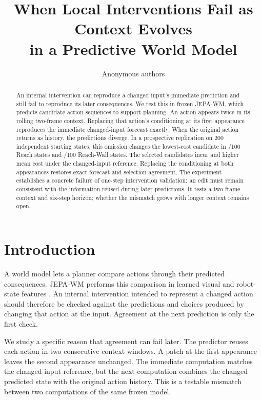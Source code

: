 \documentclass{article}
\title{When Local Interventions Fail as Context Evolves\\in a Predictive World Model}
\author{Anonymous authors}
\begin{document}
\raggedbottom
\maketitle

\begin{abstract}
An internal intervention can reproduce a changed input's immediate prediction and still fail to reproduce its later consequences. We test this in frozen JEPA-WM, which predicts candidate action sequences to support planning. An action appears twice in its rolling two-frame context. Replacing that action's conditioning at its first appearance reproduces the immediate changed-input forecast exactly. When the original action returns as history, the predictions diverge. In a prospective replication on 200 independent starting states, this omission changes the lowest-cost candidate in \LCFMReachChanged/100 Reach states and \LCFMWallChanged/100 Reach-Wall states. The selected candidates incur \LCFMReachCost{} and \LCFMWallCost{} higher mean cost under the changed-input reference. Replacing the conditioning at both appearances restores exact forecast and selection agreement. The experiment establishes a concrete failure of one-step intervention validation: an edit must remain consistent with the information reused during later predictions. It tests a two-frame context and six-step horizon; whether the mismatch grows with longer context remains open.
\end{abstract}

\section{Introduction}
A world model lets a planner compare actions through their predicted consequences. JEPA-WM performs this comparison in learned visual and robot-state features \citep{terver2025jepawm}. An internal intervention intended to represent a changed action should therefore be checked against the predictions and choices produced by changing that action at the input. Agreement at the next prediction is only the first check.

We study a specific reason that agreement can fail later. The predictor reuses each action in two consecutive context windows. A patch at the first appearance leaves the second appearance unchanged. The immediate computation matches the changed-input reference, but the next computation combines the changed predicted state with the original action history. This is a testable mismatch between two computations of the same frozen model.
\end{document}

